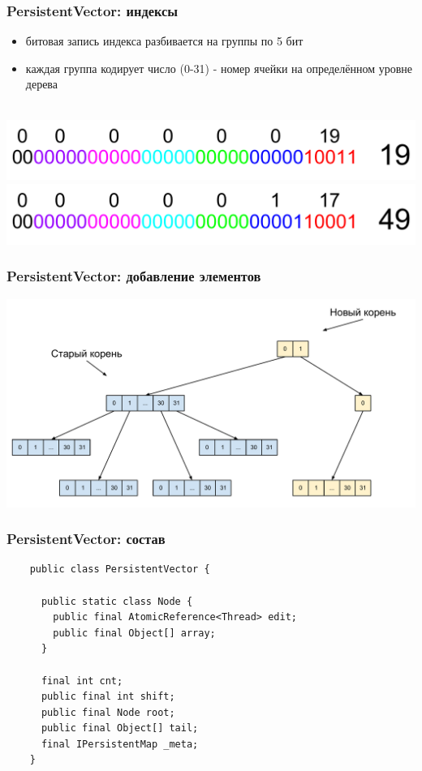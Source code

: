 \documentclass[rpussian]{beamer}
\begin{document}
\begin{frame}
  \frametitle{PersistentVector: индексы}
  \begin{itemize}
  \item битовая запись индекса разбивается на группы по 5 бит
  \item каждая группа кодирует число (0-31) - номер ячейки на определённом уровне дерева
  \end{itemize}
  \\ \vspace{0.5cm}
  \includegraphics[width=\textwidth,keepaspectration]{bits_19}
  \\ \vspace{0.5cm}
  \includegraphics[width=\textwidth,keepaspectration]{bits_49}
\end{frame}

\begin{frame}
  \frametitle{PersistentVector: добавление элементов}
  \includegraphics[width=\textwidth,keepaspectration]{32_tree_added_1}
\end{frame}

\begin{frame}[fragile]
  \frametitle{PersistentVector: состав}
  \begin{verbatim}
    public class PersistentVector {

      public static class Node {
        public final AtomicReference<Thread> edit;
        public final Object[] array;
      }

      final int cnt;
      public final int shift;
      public final Node root;
      public final Object[] tail;
      final IPersistentMap _meta;
    }
  \end{verbatim}
\end{frame}
\end{document}

